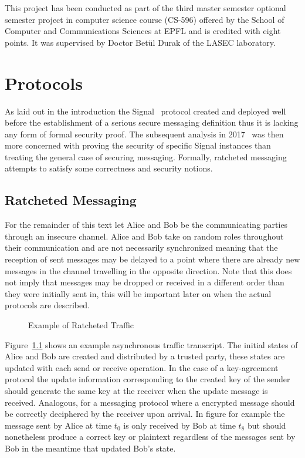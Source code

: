 \documentclass[11pt,a4paper,twoside,openright,bibliography=totoc]{scrbook}
\begin{document}
This project has been conducted as part of the third master semester optional
semester project in computer science course (CS-596) offered by the
School of Computer and Communications Sciences at EPFL and is credited
with eight points. It was supervised by Doctor Betül Durak of
the LASEC laboratory.

\chapter{Protocols}
\label{chap:protocols}

As laid out in the introduction the Signal~\cite{perrin2016double}
protocol created and deployed well before the establishment of a
serious secure messaging definition thus it is lacking any form of
formal security proof. The subsequent analysis in 2017~\cite{cohn2017formal}
was then more concerned with proving the security of specific Signal
instances than treating the general case of securing
messaging. Formally, ratcheted messaging attempts to satisfy some
correctness and security notions.


\section{Ratcheted Messaging}
\label{sec:ratcheted-messaging}

For the remainder of this text let Alice and Bob be the communicating
parties through an insecure channel. Alice and Bob take on random
roles throughout their communication and are not necessarily
synchronized meaning that the reception of sent messages may be
delayed to a point where there are already new messages in the channel
travelling in the opposite direction. Note that this does not imply
that messages may be dropped or received in a different order than
they were initially sent in, this will be important later on when
the actual protocols are described.
\begin{figure}[ht]
  \centering
   
  \caption{Example of Ratcheted Traffic}
  \label{fig:traffic}
\end{figure}
Figure~\ref{fig:traffic} shows an example asynchronous traffic
transcript. The initial states of Alice and Bob are created and
distributed by a trusted party, these states are updated with each
send or receive operation. In the case of a key-agreement protocol the
update information corresponding to the created key of the sender
should generate the same key at the receiver when the update message
is received. Analogous, for a messaging protocol where a encrypted
message should be correctly deciphered by the receiver upon
arrival. In figure for example the message sent by Alice at time $t_0$
is only received by Bob at time $t_8$ but should nonetheless produce a
correct key or plaintext regardless of the messages sent by Bob in the
meantime that updated Bob's state.
\end{document}
